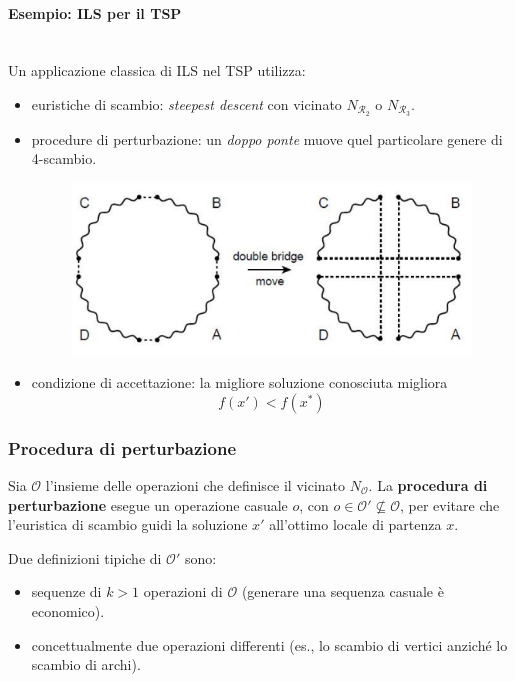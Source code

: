 \documentclass{article}
\begin{document}
\paragraph{Esempio: ILS per il TSP}\mbox{}\\
Un applicazione classica di ILS nel TSP utilizza:
\begin{itemize}
    \item euristiche di scambio: \textit{steepest descent} con vicinato $N_{\mathcal{R}_2}$ o
    $N_{\mathcal{R}_3}$.

    \item procedure di perturbazione: un \textit{doppo ponte} muove quel particolare
    genere di 4-scambio.
    \begin{figure}[H]
        \centering
        \includegraphics[scale=0.5]{images/ILS_TSP.png}
    \end{figure}

    \item condizione di accettazione: la migliore soluzione conosciuta migliora
    $$f(x')<f(x^*)$$
\end{itemize}

\subsubsection{Procedura di perturbazione}
Sia $\mathcal{O}$ l'insieme delle operazioni che definisce il vicinato $N_{\mathcal{O}}$. La
\textbf{procedura di perturbazione} esegue un operazione casuale $o$, con $o\in\mathcal{O}'\nsubseteq\mathcal{O}$,
per evitare che l'euristica di scambio guidi la soluzione $x'$ all'ottimo locale di partenza $x$.

Due definizioni tipiche di $\mathcal{O}'$ sono:
\begin{itemize}
    \item sequenze di $k>1$ operazioni di $\mathcal{O}$ (generare una sequenza casuale è economico).
    \item concettualmente due operazioni differenti (es., lo scambio di vertici anziché lo scambio di archi).
\end{itemize}
\end{document}
